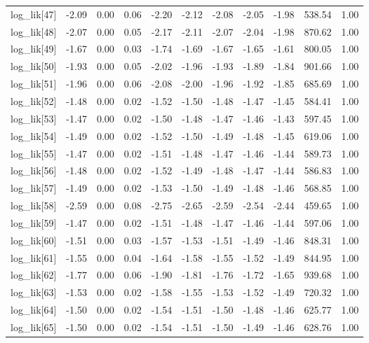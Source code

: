 \begin{table}[ht]
\begin{tabular}{rrrrrrrrrrr}
  log\_lik[47] & -2.09 & 0.00 & 0.06 & -2.20 & -2.12 & -2.08 & -2.05 & -1.98 & 538.54 & 1.00 \\ 
  log\_lik[48] & -2.07 & 0.00 & 0.05 & -2.17 & -2.11 & -2.07 & -2.04 & -1.98 & 870.62 & 1.00 \\ 
  log\_lik[49] & -1.67 & 0.00 & 0.03 & -1.74 & -1.69 & -1.67 & -1.65 & -1.61 & 800.05 & 1.00 \\ 
  log\_lik[50] & -1.93 & 0.00 & 0.05 & -2.02 & -1.96 & -1.93 & -1.89 & -1.84 & 901.66 & 1.00 \\ 
  log\_lik[51] & -1.96 & 0.00 & 0.06 & -2.08 & -2.00 & -1.96 & -1.92 & -1.85 & 685.69 & 1.00 \\ 
  log\_lik[52] & -1.48 & 0.00 & 0.02 & -1.52 & -1.50 & -1.48 & -1.47 & -1.45 & 584.41 & 1.00 \\ 
  log\_lik[53] & -1.47 & 0.00 & 0.02 & -1.50 & -1.48 & -1.47 & -1.46 & -1.43 & 597.45 & 1.00 \\ 
  log\_lik[54] & -1.49 & 0.00 & 0.02 & -1.52 & -1.50 & -1.49 & -1.48 & -1.45 & 619.06 & 1.00 \\ 
  log\_lik[55] & -1.47 & 0.00 & 0.02 & -1.51 & -1.48 & -1.47 & -1.46 & -1.44 & 589.73 & 1.00 \\ 
  log\_lik[56] & -1.48 & 0.00 & 0.02 & -1.52 & -1.49 & -1.48 & -1.47 & -1.44 & 586.83 & 1.00 \\ 
  log\_lik[57] & -1.49 & 0.00 & 0.02 & -1.53 & -1.50 & -1.49 & -1.48 & -1.46 & 568.85 & 1.00 \\ 
  log\_lik[58] & -2.59 & 0.00 & 0.08 & -2.75 & -2.65 & -2.59 & -2.54 & -2.44 & 459.65 & 1.00 \\ 
  log\_lik[59] & -1.47 & 0.00 & 0.02 & -1.51 & -1.48 & -1.47 & -1.46 & -1.44 & 597.06 & 1.00 \\ 
  log\_lik[60] & -1.51 & 0.00 & 0.03 & -1.57 & -1.53 & -1.51 & -1.49 & -1.46 & 848.31 & 1.00 \\ 
  log\_lik[61] & -1.55 & 0.00 & 0.04 & -1.64 & -1.58 & -1.55 & -1.52 & -1.49 & 844.95 & 1.00 \\ 
  log\_lik[62] & -1.77 & 0.00 & 0.06 & -1.90 & -1.81 & -1.76 & -1.72 & -1.65 & 939.68 & 1.00 \\ 
  log\_lik[63] & -1.53 & 0.00 & 0.02 & -1.58 & -1.55 & -1.53 & -1.52 & -1.49 & 720.32 & 1.00 \\ 
  log\_lik[64] & -1.50 & 0.00 & 0.02 & -1.54 & -1.51 & -1.50 & -1.48 & -1.46 & 625.77 & 1.00 \\ 
  log\_lik[65] & -1.50 & 0.00 & 0.02 & -1.54 & -1.51 & -1.50 & -1.49 & -1.46 & 628.76 & 1.00 \\ 

\end{tabular}
\end{table}
